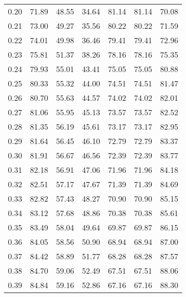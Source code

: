\begin{tabular}{|c|c|c|c|c|c|c|}
      0.20 &     71.89 &     48.55 &      34.64 &   81.14 &      81.14 &         70.08 \\
      0.21 &     73.00 &     49.27 &      35.56 &   80.22 &      80.22 &         71.59 \\
      0.22 &     74.01 &     49.98 &      36.46 &   79.41 &      79.41 &         72.96 \\
      0.23 &     75.81 &     51.37 &      38.26 &   78.16 &      78.16 &         75.35 \\
      0.24 &     79.93 &     55.01 &      43.41 &   75.05 &      75.05 &         80.88 \\
      0.25 &     80.33 &     55.32 &      44.00 &   74.51 &      74.51 &         81.47 \\
      0.26 &     80.70 &     55.63 &      44.57 &   74.02 &      74.02 &         82.01 \\
      0.27 &     81.06 &     55.95 &      45.13 &   73.57 &      73.57 &         82.52 \\
      0.28 &     81.35 &     56.19 &      45.61 &   73.17 &      73.17 &         82.95 \\
      0.29 &     81.64 &     56.45 &      46.10 &   72.79 &      72.79 &         83.37 \\
      0.30 &     81.91 &     56.67 &      46.56 &   72.39 &      72.39 &         83.77 \\
      0.31 &     82.18 &     56.91 &      47.06 &   71.96 &      71.96 &         84.18 \\
      0.32 &     82.51 &     57.17 &      47.67 &   71.39 &      71.39 &         84.69 \\
      0.33 &     82.82 &     57.43 &      48.27 &   70.90 &      70.90 &         85.15 \\
      0.34 &     83.12 &     57.68 &      48.86 &   70.38 &      70.38 &         85.61 \\
      0.35 &     83.49 &     58.04 &      49.64 &   69.87 &      69.87 &         86.15 \\
      0.36 &     84.05 &     58.56 &      50.90 &   68.94 &      68.94 &         87.00 \\
      0.37 &     84.42 &     58.89 &      51.77 &   68.28 &      68.28 &         87.57 \\
      0.38 &     84.70 &     59.06 &      52.49 &   67.51 &      67.51 &         88.06 \\
      0.39 &     84.84 &     59.16 &      52.86 &   67.16 &      67.16 &         88.30 \\

\end{tabular}
